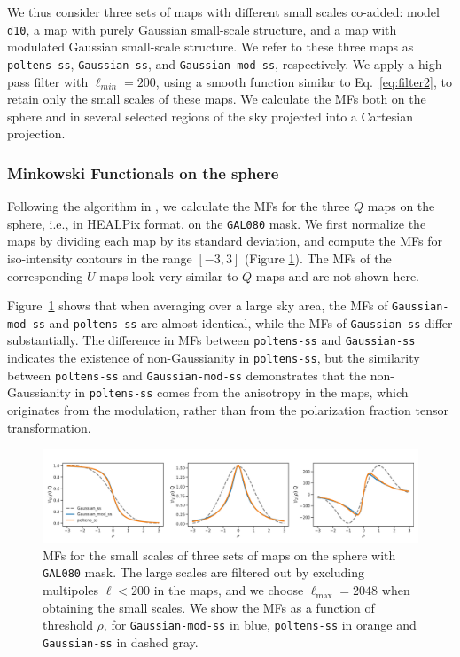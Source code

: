 \documentclass[twocolumn]{aastex631}
\begin{document}
We thus consider three sets of maps with different small scales co-added: model \texttt{d10}, a map with purely Gaussian small-scale structure, and a map with modulated Gaussian small-scale structure. We refer to these three maps as \texttt{poltens-ss}, \texttt{Gaussian-ss}, and \texttt{Gaussian-mod-ss}, respectively. 
We apply a high-pass filter with $\ell_{min} = 200$, using a smooth function similar to Eq.~\ref{eq:filter2}, to retain only the small scales of these maps. We calculate the MFs both on the sphere and in several selected regions of the sky projected into a Cartesian projection. 


\subsubsection{Minkowski Functionals on the sphere}

Following the algorithm in \cite{Grewal:2022}, we calculate the MFs for the three $Q$ maps on the sphere, i.e., in HEALPix format, on the \texttt{GAL080} mask. We first normalize the maps by dividing each map by its standard deviation, and compute the MFs for iso-intensity contours in the range $[-3, 3]$ (Figure \ref{fig:MF:sphere}). The MFs of the corresponding $U$ maps look very similar to $Q$ maps and are not shown here.

Figure~\ref{fig:MF:sphere} shows that when averaging over a large sky area, the MFs of \texttt{Gaussian-mod-ss} and \texttt{poltens-ss} are almost identical, while the MFs of \texttt{Gaussian-ss} differ substantially. The difference in MFs between \texttt{poltens-ss} and \texttt{Gaussian-ss} indicates the existence of non-Gaussianity in \texttt{poltens-ss}, but the similarity between \texttt{poltens-ss} and \texttt{Gaussian-mod-ss} demonstrates that the non-Gaussianity in \texttt{poltens-ss} comes from the anisotropy in the maps, which originates from the modulation, rather than from the polarization fraction tensor transformation.

\begin{figure}
    \centering
    \includegraphics[width=180mm]{figures/MFs_80p_sky_Q.pdf}
    \caption{MFs for the small scales of three sets of maps on the sphere with \texttt{GAL080} mask. The large scales are filtered out by excluding multipoles $\ell < 200$ in the maps, and we choose $\ell_\text{max} = 2048$ when obtaining the small scales. We show the MFs as a function of threshold $\rho$, for \texttt{Gaussian-mod-ss} in blue, \texttt{poltens-ss} in orange and \texttt{Gaussian-ss} in dashed gray.}
    \label{fig:MF:sphere}
\end{figure}
\end{document}

